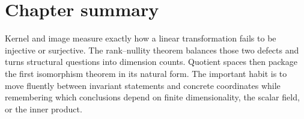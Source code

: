 \section*{Chapter summary}
Kernel and image measure exactly how a linear transformation fails to be injective or surjective. The rank–nullity theorem balances those two defects and turns structural questions into dimension counts. Quotient spaces then package the first isomorphism theorem in its natural form.
The important habit is to move fluently between invariant statements and concrete coordinates while remembering which conclusions depend on finite dimensionality, the scalar field, or the inner product.
